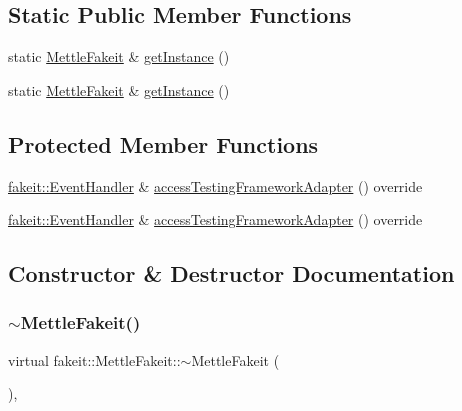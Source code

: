 \subsection*{Static Public Member Functions}
\begin{DoxyCompactItemize}
\item 
static \mbox{\hyperlink{classfakeit_1_1MettleFakeit}{Mettle\+Fakeit}} \& \mbox{\hyperlink{classfakeit_1_1MettleFakeit_a41e07008725a0a812e0fc6b0c17b7d61}{get\+Instance}} ()
\item 
static \mbox{\hyperlink{classfakeit_1_1MettleFakeit}{Mettle\+Fakeit}} \& \mbox{\hyperlink{classfakeit_1_1MettleFakeit_a41e07008725a0a812e0fc6b0c17b7d61}{get\+Instance}} ()
\end{DoxyCompactItemize}
\subsection*{Protected Member Functions}
\begin{DoxyCompactItemize}
\item 
\mbox{\hyperlink{structfakeit_1_1EventHandler}{fakeit\+::\+Event\+Handler}} \& \mbox{\hyperlink{classfakeit_1_1MettleFakeit_a6bedc435877e97e0b6095a9e5f1508cb}{access\+Testing\+Framework\+Adapter}} () override
\item 
\mbox{\hyperlink{structfakeit_1_1EventHandler}{fakeit\+::\+Event\+Handler}} \& \mbox{\hyperlink{classfakeit_1_1MettleFakeit_a6bedc435877e97e0b6095a9e5f1508cb}{access\+Testing\+Framework\+Adapter}} () override
\end{DoxyCompactItemize}


\subsection{Constructor \& Destructor Documentation}
\mbox{\label{classfakeit_1_1MettleFakeit_acc3b582d321321935850e554ba1d16a9}} 
\subsubsection{\texorpdfstring{$\sim$MettleFakeit()}{~MettleFakeit()}\hspace{0.1cm}{\footnotesize\ttfamily [1/2]}}
{\footnotesize\ttfamily virtual fakeit\+::\+Mettle\+Fakeit\+::$\sim$\+Mettle\+Fakeit (\begin{DoxyParamCaption}{ }\end{DoxyParamCaption})\hspace{0.3cm}{\ttfamily [virtual]}, {\ttfamily [default]}}

